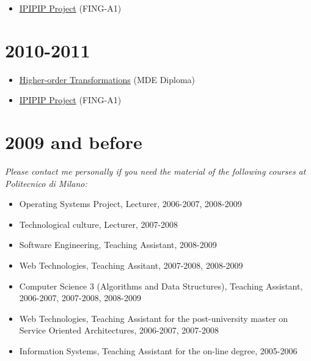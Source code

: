 \begin{itemize}
\tightlist
\item
  \href{https://campusneo.mines-nantes.fr/campus/course/view.php?id=391}{IPIPIP
  Project} (FING-A1)
\end{itemize}

\hypertarget{section-10}{%
\section{2010-2011}\label{section-10}}

\begin{itemize}
\tightlist
\item
  \href{http://web.emn.fr/x-info/atlanmod/index.php?title=The_MDE_Diploma}{Higher-order
  Transformations} (MDE Diploma)
\item
  \href{https://campusneo.mines-nantes.fr/campus/course/view.php?id=391}{IPIPIP
  Project} (FING-A1)
\end{itemize}

\hypertarget{and-before}{%
\section{2009 and before}\label{and-before}}

\emph{Please contact me personally if you need the material of the
following courses at Politecnico di Milano:}

\begin{itemize}
\tightlist
\item
  Operating Systems Project, Lecturer, 2006-2007, 2008-2009
\item
  Technological culture, Lecturer, 2007-2008
\item
  Software Engineering, Teaching Assistant, 2008-2009
\item
  Web Technologies, Teaching Assitant, 2007-2008, 2008-2009
\item
  Computer Science 3 (Algorithms and Data Structures), Teaching
  Assistant, 2006-2007, 2007-2008, 2008-2009
\item
  Web Technologies, Teaching Assistant for the post-university master on
  Service Oriented Architectures, 2006-2007, 2007-2008
\item
  Information Systems, Teaching Assistant for the on-line degree,
  2005-2006
\end{itemize}
